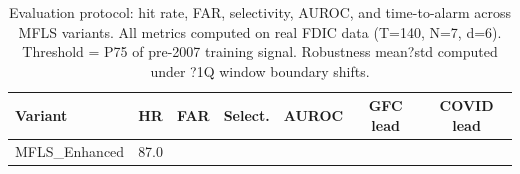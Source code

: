 \begin{table}[htbp]
\centering
\caption{Evaluation protocol: hit rate, FAR, selectivity, AUROC, and time-to-alarm across MFLS variants. All metrics computed on real FDIC data (T=140, N=7, d=6). Threshold = P75 of pre-2007 training signal. Robustness mean?std computed under ?1Q window boundary shifts.}
\label{tab:eval_protocol}
\begin{tabular}{lcccccc}
\toprule
Variant & HR & FAR & Select. & AUROC & GFC lead & COVID lead \\
\midrule
MFLS_Enhanced & 87.0%
\bottomrule
\end{tabular}
\end{table}
